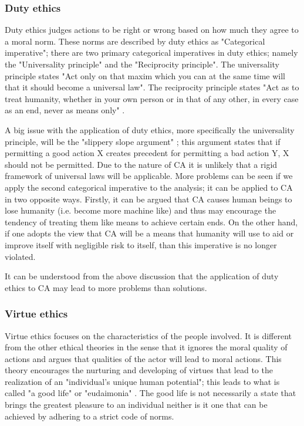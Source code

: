 
\subsubsection{Duty ethics}

Duty ethics judges actions to be right or wrong based on how much they agree to a moral norm. These norms are described by duty ethics as "Categorical imperative"; there are two primary categorical imperatives in duty ethics; namely the "Universality principle" and the "Reciprocity principle". The universality principle states "Act only on that maxim which you can at the same time will that it should become a universal law"\cite[ch. 3.8]{Ethics_textbook}. The reciprocity principle states "Act as to treat humanity, whether in your own person or in that of any other, in every case as an end, never as means only" \cite[ch. 3.8]{Ethics_textbook}.

A big issue with the application of duty ethics, more specifically the universality principle, will be the "slippery slope argument" \cite{van1991slippery,resnik1994debunking}; this argument states that if permitting a good action X creates precedent for permitting a bad action Y, X should not be permitted. Due to the nature of CA it is unlikely that a rigid framework of universal laws will be applicable. More problems can be seen if we apply the second categorical imperative to the analysis; it can be applied to CA in two opposite ways. Firstly, it can be argued that CA causes human beings to lose humanity (i.e. become more machine like) and thus may encourage the tendency of treating them like means to achieve certain ends. On the other hand, if one adopts the view that CA will be a means that humanity will use to aid or improve itself with negligible risk to itself, than this imperative is no longer violated.

It can be understood from the above discussion that the application of duty ethics to CA may lead to more problems than solutions.

\subsubsection{Virtue ethics}

Virtue ethics focuses on the characteristics of the people involved. It is different from the other ethical theories in the sense that it ignores the moral quality of actions and argues that qualities of the actor will lead to moral actions. This theory encourages the nurturing and developing of virtues that lead to the realization of an "individual's unique human potential"; this leads to what is called "a good life" or "eudaimonia" \cite[ch. 3.9]{Ethics_textbook}. The good life is not necessarily a state that brings the greatest pleasure to an individual neither is it one that can be achieved by adhering to a strict code of norms.

